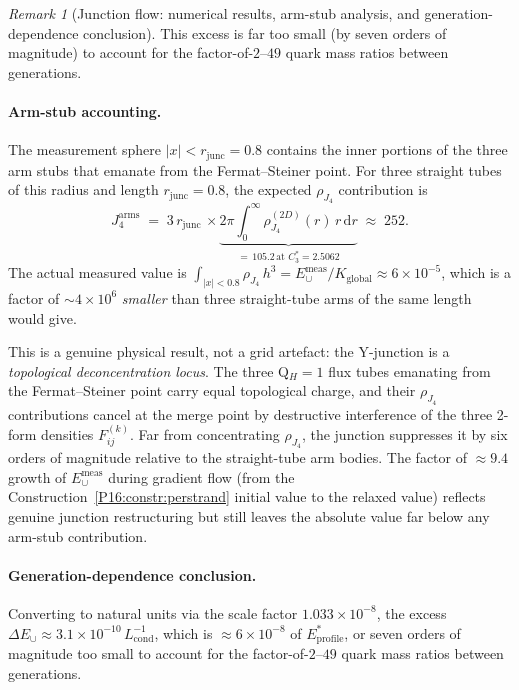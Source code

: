 \documentclass[11pt,a4paper]{article}
\theoremstyle{definition}\newtheorem{definition}[theorem]{Definition}
\theoremstyle{remark}
\newtheorem{remark}[theorem]{Remark}
\theoremstyle{definition}\newtheorem{construction}[theorem]{Construction}
\begin{document}
\begin{remark}[Junction flow: numerical results, arm-stub analysis, and generation-dependence conclusion]
This excess is far too small (by seven orders of magnitude) to account
for the factor-of-$2$--$49$ quark mass ratios between generations.

\paragraph{Arm-stub accounting.}
The measurement sphere $|x|<r_{\mathrm{junc}}=0.8$ contains the
inner portions of the three arm stubs that emanate from the
Fermat--Steiner point. For three straight tubes of this radius and
length $r_{\mathrm{junc}}=0.8$, the expected $\rho_{J_4}$ contribution
is
\begin{equation}
  J_4^{\mathrm{arms}} \;=\; 3\,r_{\mathrm{junc}}\,\times
  \underbrace{2\pi\int_0^\infty \rho_{J_4}^{(2D)}(r)\,r\,\mathrm{d}r}_{=\,105.2\,
  \text{at }C_3^*=2.5062}
  \;\approx\; 252.
\end{equation}
The actual measured value is $\int_{|x|<0.8}\rho_{J_4}\,h^3
= E_\cup^{\mathrm{meas}}/K_{\mathrm{global}} \approx 6\times10^{-5}$,
which is a factor of $\sim4\times10^6$ \emph{smaller} than three
straight-tube arms of the same length would give.

This is a genuine physical result, not a grid artefact: the Y-junction
is a \emph{topological deconcentration locus}. The three Q$_H=1$ flux
tubes emanating from the Fermat--Steiner point carry equal topological
charge, and their $\rho_{J_4}$ contributions cancel at the merge
point by destructive interference of the three 2-form densities
$F_{ij}^{(k)}$. Far from concentrating $\rho_{J_4}$, the junction
suppresses it by six orders of magnitude relative to the straight-tube
arm bodies. The factor of $\approx9.4$ growth of $E_\cup^{\mathrm{meas}}$
during gradient flow (from the Construction~\ref{P16:constr:perstrand} initial value to the
relaxed value) reflects genuine junction restructuring but still leaves
the absolute value far below any arm-stub contribution.

\paragraph{Generation-dependence conclusion.}
Converting to natural units via the scale factor $1.033\times10^{-8}$,
the excess $\Delta E_\cup\approx3.1\times10^{-10}\,L_{\mathrm{cond}}^{-1}$,
which is $\approx6\times10^{-8}$ of $E_{\mathrm{profile}}^*$, or seven
orders of magnitude too small to account for the factor-of-$2$--$49$
quark mass ratios between generations.


\end{remark}
\end{document}
